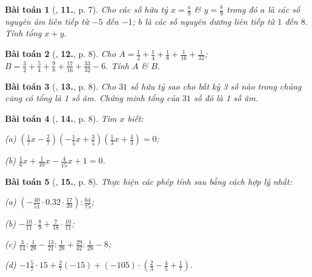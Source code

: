 \documentclass{article}
\numberwithin{equation}{section}
\newtheorem{baitoan}{Bài toán}[section]
\begin{document}
\begin{baitoan}[\cite{Tuyen_Toan_7}, \textbf{11.}, p. 7]
	Cho các số hữu tỷ $x = \frac{a}{9}$ \& $y = \frac{b}{9}$ trong đó $a$ là các số nguyên âm liên tiếp từ $-5$ đến $-1$; $b$ là các số nguyên dương liên tiếp từ $1$ đến $8$. Tính tổng $x + y$.
\end{baitoan}

\begin{baitoan}[\cite{Tuyen_Toan_7}, \textbf{12.}, p. 8]
	Cho $A = \frac{1}{2} + \frac{1}{4} + \frac{1}{8} + \frac{1}{16} + \frac{1}{32}$; $B = \frac{3}{2} + \frac{5}{4} + \frac{9}{8} + \frac{17}{16} + \frac{33}{32} - 6$. Tính $A$ \& $B$.
\end{baitoan}

\begin{baitoan}[\cite{Tuyen_Toan_7}, \textbf{13.}, p. 8]
	Cho $31$ số hữu tỷ sao cho bất kỳ 3 số nào trong chúng cũng có tổng là 1 số âm. Chứng minh tổng của $31$ số đó là 1 số âm.
\end{baitoan}

\begin{baitoan}[\cite{Tuyen_Toan_7}, \textbf{14.}, p. 8]
	Tìm $x$ biết:
	\begin{enumerate*}
		\item[(a)] $\left(\frac{1}{7}x - \frac{2}{7}\right)\left(-\frac{1}{5}x + \frac{3}{5}\right)\left(\frac{1}{3}x + \frac{4}{3}\right) = 0$;
		\item[(b)] $\frac{1}{6}x + \frac{1}{10}x - \frac{4}{15}x + 1 = 0$.
	\end{enumerate*}
\end{baitoan}

\begin{baitoan}[\cite{Tuyen_Toan_7}, \textbf{15.}, p. 8]
	Thực hiện các phép tính sau bằng cách hợp lý nhất:
	\begin{enumerate*}
		\item[(a)] $\left(-\frac{40}{51}\cdot 0.32\cdot\frac{17}{20}\right):\frac{64}{75}$;
		\item[(b)] $-\frac{10}{11}\cdot\frac{8}{9} + \frac{7}{18}\cdot\frac{10}{11}$;
		\item[(c)] $\frac{3}{14}:\frac{1}{28} - \frac{13}{21}:\frac{1}{28} + \frac{29}{42}:\frac{1}{28} - 8$;
		\item[(d)] $-1\frac{5}{7}\cdot 15 + \frac{2}{7}(-15) + (-105)\cdot\left(\frac{2}{3} - \frac{4}{5} + \frac{1}{7}\right)$.
	\end{enumerate*}
\end{baitoan}
\end{document}

